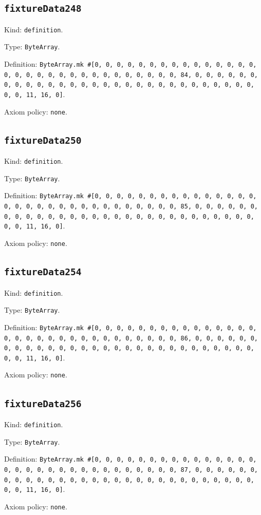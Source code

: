 \documentclass[11pt]{article}
\begin{document}
\subsection*{\texttt{fixtureData248}}
\noindent Kind: \texttt{definition}.\par
\noindent Type: \texttt{ByteArray}.\par
\noindent Definition: \texttt{ByteArray.mk \#[0, 0, 0, 0, 0, 0, 0, 0, 0, 0, 0, 0, 0, 0, 0, 0, 0, 0, 0, 0, 0, 0, 0, 0, 0, 0, 0, 0, 0, 0, 0, 84, 0, 0, 0, 0, 0, 0, 0, 0, 0, 0, 0, 0, 0, 0, 0, 0, 0, 0, 0, 0, 0, 0, 0, 0, 0, 0, 0, 0, 0, 0, 0, 11, 16, 0]}.\par
\noindent Axiom policy: \texttt{none}.\par
\subsection*{\texttt{fixtureData250}}
\noindent Kind: \texttt{definition}.\par
\noindent Type: \texttt{ByteArray}.\par
\noindent Definition: \texttt{ByteArray.mk \#[0, 0, 0, 0, 0, 0, 0, 0, 0, 0, 0, 0, 0, 0, 0, 0, 0, 0, 0, 0, 0, 0, 0, 0, 0, 0, 0, 0, 0, 0, 0, 85, 0, 0, 0, 0, 0, 0, 0, 0, 0, 0, 0, 0, 0, 0, 0, 0, 0, 0, 0, 0, 0, 0, 0, 0, 0, 0, 0, 0, 0, 0, 0, 11, 16, 0]}.\par
\noindent Axiom policy: \texttt{none}.\par
\subsection*{\texttt{fixtureData254}}
\noindent Kind: \texttt{definition}.\par
\noindent Type: \texttt{ByteArray}.\par
\noindent Definition: \texttt{ByteArray.mk \#[0, 0, 0, 0, 0, 0, 0, 0, 0, 0, 0, 0, 0, 0, 0, 0, 0, 0, 0, 0, 0, 0, 0, 0, 0, 0, 0, 0, 0, 0, 0, 86, 0, 0, 0, 0, 0, 0, 0, 0, 0, 0, 0, 0, 0, 0, 0, 0, 0, 0, 0, 0, 0, 0, 0, 0, 0, 0, 0, 0, 0, 0, 0, 11, 16, 0]}.\par
\noindent Axiom policy: \texttt{none}.\par
\subsection*{\texttt{fixtureData256}}
\noindent Kind: \texttt{definition}.\par
\noindent Type: \texttt{ByteArray}.\par
\noindent Definition: \texttt{ByteArray.mk \#[0, 0, 0, 0, 0, 0, 0, 0, 0, 0, 0, 0, 0, 0, 0, 0, 0, 0, 0, 0, 0, 0, 0, 0, 0, 0, 0, 0, 0, 0, 0, 87, 0, 0, 0, 0, 0, 0, 0, 0, 0, 0, 0, 0, 0, 0, 0, 0, 0, 0, 0, 0, 0, 0, 0, 0, 0, 0, 0, 0, 0, 0, 0, 11, 16, 0]}.\par
\noindent Axiom policy: \texttt{none}.\par
\end{document}
